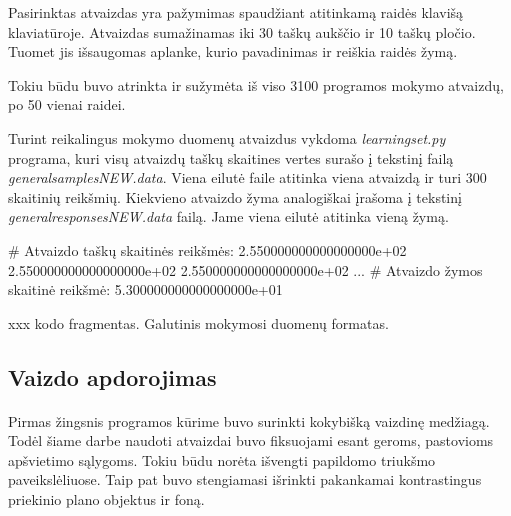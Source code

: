 \documentclass[a4paper,12pt]{article}
\begin{document}
Pasirinktas atvaizdas yra pažymimas spaudžiant atitinkamą raidės klavišą klaviatūroje. Atvaizdas sumažinamas iki 30 taškų aukščio ir 10 taškų pločio. Tuomet jis išsaugomas aplanke, kurio pavadinimas ir reiškia raidės žymą.
 
Tokiu būdu buvo atrinkta ir sužymėta iš viso 3100 programos mokymo atvaizdų, po 50 vienai raidei. 

Turint reikalingus mokymo duomenų atvaizdus vykdoma \textit{learningset.py} programa, kuri visų atvaizdų taškų skaitines vertes surašo į tekstinį failą \textit{generalsamplesNEW.data}. Viena eilutė faile atitinka viena atvaizdą ir turi 300 skaitinių reikšmių. Kiekvieno atvaizdo žyma analogiškai įrašoma į tekstinį \textit{generalresponsesNEW.data} failą. Jame viena eilutė atitinka vieną žymą.

	\begin{listing}[H]
\begin{pythoncode}
# Atvaizdo taškų skaitinės reikšmės:
2.550000000000000000e+02 2.550000000000000000e+02 2.550000000000000000e+02 ...
# Atvaizdo žymos skaitinė reikšmė:
5.300000000000000000e+01
\end{pythoncode}
		\begin{center}
			xxx kodo fragmentas. Galutinis mokymosi duomenų formatas.
		\end{center}		
	\end{listing}


\subsection{Vaizdo apdorojimas}
 \paragraph{} Pirmas žingsnis programos kūrime buvo surinkti kokybišką vaizdinę medžiagą. Todėl šiame darbe naudoti atvaizdai buvo fiksuojami esant geroms, pastovioms apšvietimo sąlygoms. Tokiu būdu norėta išvengti papildomo triukšmo paveikslėliuose. Taip pat buvo stengiamasi išrinkti pakankamai kontrastingus priekinio plano objektus ir foną.
 
\end{document}
